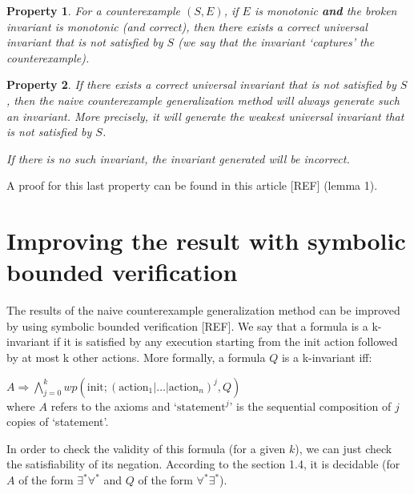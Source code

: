 \documentclass[11pt,a4paper,oldfontcommands,openany]{memoir}
\newtheorem*{property}{Property}
\begin{document}
    \begin{property}
        For a counterexample \((S,E)\), if \(E\) is monotonic \textbf{and} the broken invariant is monotonic (and correct),
        then there exists a correct universal invariant that is not satisfied by \(S\) (we say that the invariant `captures' the counterexample).
    \end{property}
    \begin{property}
        If there exists a correct universal invariant that is not satisfied by \(S\), then
        the naive counterexample generalization method will always generate such an invariant.
        More precisely, it will generate the weakest universal invariant that is not satisfied by \(S\).

        If there is no such invariant, the invariant generated will be incorrect.
    \end{property}
    
    A proof for this last property can be found in this article [REF] (lemma 1).

    \section{Improving the result with symbolic bounded verification}

    The results of the naive counterexample generalization method can be improved by using symbolic bounded verification [REF].
    We say that a formula is a k-invariant if it is satisfied by any execution starting from the init action followed by at most k
    other actions. More formally, a formula \(Q\) is a k-invariant iff:

    \( A \Rightarrow \bigwedge\limits_{j=0}^k wp(\text{init}; (\text{action}_1|\ldots|\text{action}_n)^j, Q) \)\\
    where \(A\) refers to the axioms and `\(\text{statement}^j\)' is the sequential composition of \(j\) copies of `statement'.

    In order to check the validity of this formula (for a given \(k\)), we can just check the satisfiability of its negation.
    According to the section 1.4, it is decidable (for \(A\) of the form \(\exists^*\forall^*\) and \(Q\) of the form \(\forall^*\exists^*\)).
\end{document}
